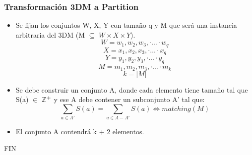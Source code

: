 \documentclass{beamer}
\begin{document}

\begin{frame}
\frametitle{Transformaci\'on 3DM a Partition}
\begin{itemize}
\item Se fijan los conjuntos W, X, Y con tamaño q y M que ser\'a una instancia
arbitraria del 3DM (M $\subseteq$ $W \times X \times Y$).
	$$W = w_{1}, w_{2}, w_{3}, \cdot\ldots\cdot w_{q}$$
	$$X = x_{1}, x_{2}, x_{3}, \cdot\ldots\cdot x_{q}$$
	$$Y = y_{1}, y_{2}, y_{3}, \cdot\ldots\cdot y_{q}$$
	$$M = m_{1}, m_{2}, m_{3}, \cdot\ldots\cdot m_{k}$$ 
	$$ k = |M|$$
	
\item Se debe construir un conjunto A, donde cada elemento tiene tama\~{n}o tal que S(a) $\in$ \(\mathbb{Z}\)$\textsuperscript{+}$ y ese A debe contener un subconjunto A' tal que:
	$$\sum\limits_{a \in A'} S(a) = \sum\limits_{a \in A - A'} S(a) \iff matching(M)$$
\item El conjunto A contendr\'a k + 2 elementos.
\end{itemize}
\end{frame}



\begin{frame}
\Huge{\centerline{FIN}}
\end{frame}

\end{document}
